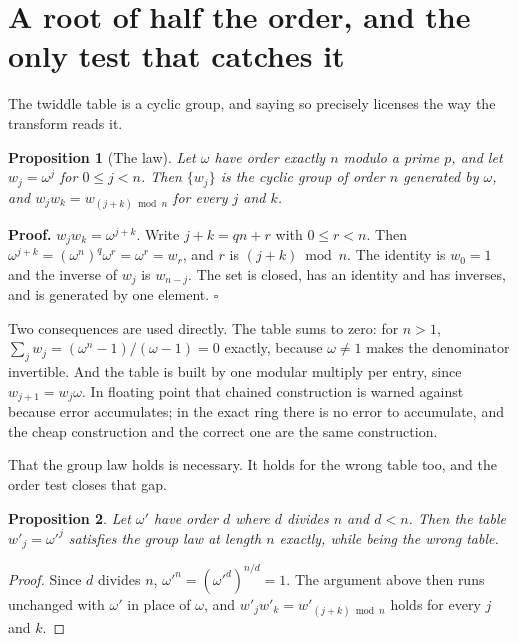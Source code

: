 \documentclass{article}
\newtheorem{proposition}{Proposition}
\begin{document}
\section{A root of half the order, and the only test that catches it}

The twiddle table is a cyclic group, and saying so precisely licenses the way the transform reads it.

\begin{proposition}[The law]
Let \(\omega\) have order exactly \(n\) modulo a prime \(p\), and let \(w_j = \omega^j\) for \(0 \le j < n\). Then \(\{w_j\}\) is the cyclic group of order \(n\) generated by \(\omega\), and \(w_j w_k = w_{(j+k) \bmod n}\) for every \(j\) and \(k\).
\end{proposition}

\textbf{Proof.} \(w_j w_k = \omega^{j+k}\). Write \(j + k = qn + r\) with \(0 \le r < n\). Then \(\omega^{j+k} = (\omega^n)^q \omega^r = \omega^r = w_r\), and \(r\) is \((j+k) \bmod n\). The identity is \(w_0 = 1\) and the inverse of \(w_j\) is \(w_{n-j}\). The set is closed, has an identity and has inverses, and is generated by one element. \(\square\)

Two consequences are used directly. The table sums to zero: for \(n > 1\), \(\sum_j w_j = (\omega^n - 1)/(\omega - 1) = 0\) exactly, because \(\omega \ne 1\) makes the denominator invertible. And the table is built by one modular multiply per entry, since \(w_{j+1} = w_j \omega\). In floating point that chained construction is warned against because error accumulates; in the exact ring there is no error to accumulate, and the cheap construction and the correct one are the same construction.

That the group law holds is necessary. It holds for the wrong table too, and the order test closes that gap.

\begin{proposition}
Let \(\omega'\) have order \(d\) where \(d\) divides \(n\) and \(d < n\). Then the table \(w'_j = \omega'^j\) satisfies the group law at length \(n\) exactly, while being the wrong table.
\end{proposition}

\begin{proof}
Since \(d\) divides \(n\), \(\omega'^n = (\omega'^d)^{n/d} = 1\). The argument above then runs unchanged with \(\omega'\) in place of \(\omega\), and \(w'_j w'_k = w'_{(j+k) \bmod n}\) holds for every \(j\) and \(k\).
\end{proof}
\end{document}
